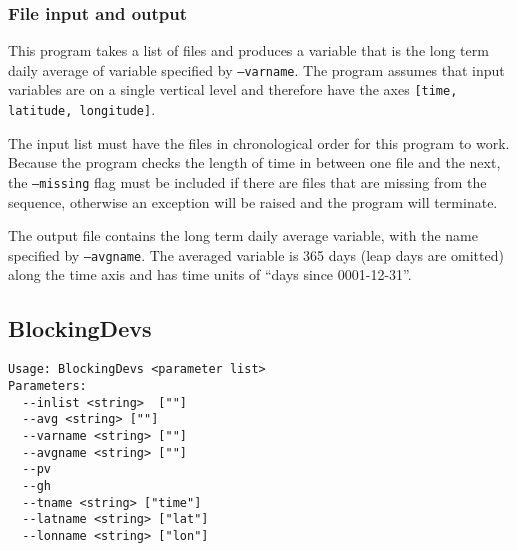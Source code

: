 \documentclass{article}
\begin{document}
\subsubsection{File input and output}
This program takes a list of files and produces a variable that is the long term daily average of variable specified by \texttt{--varname}. The program assumes that input variables are on a single vertical level and therefore have the axes \texttt{[time, latitude, longitude]}. 

The input list must have the files in chronological order for this program to work. Because the program checks the length of time in between one file and the next, the \texttt{--missing} flag must be included if there are files that  are missing from the sequence, otherwise an exception will be raised and the program will terminate.

The output file contains the long term daily average variable, with the name specified by \texttt{--avgname}. The averaged variable is 365 days (leap days are omitted) along the time axis and has time units of ``days since 0001-12-31''.





\subsection{BlockingDevs}
\begin{verbatim}
Usage: BlockingDevs <parameter list>
Parameters:
  --inlist <string>  [""]
  --avg <string> [""]
  --varname <string> [""]
  --avgname <string> [""]
  --pv
  --gh
  --tname <string> ["time"]
  --latname <string> ["lat"]
  --lonname <string> ["lon"]
\end{verbatim}
\end{document}
